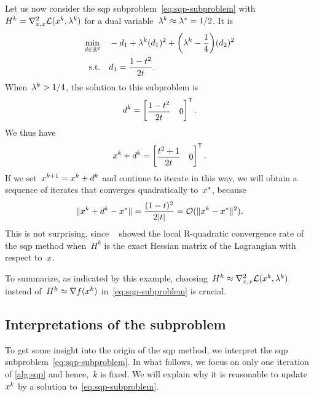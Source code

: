 Let us now consider the \gls{sqp} subproblem~\cref{eq:sqp-subproblem} with~$H^k = \nabla_{x, x}^2 \lag(\iter[k], \lm[k])$ for a dual variable~$\lm[k] \approx \lm[\ast] = 1/2$.
It is
\begin{align*}
    \min_{\step \in \R^2}   & \quad -\step_1 + \lm[k] (\step_1)^2 + \bigg( \lm[k] - \frac{1}{4} \bigg) (\step_2)^2\\
    \text{s.t.}             & \quad \step_1 = \frac{1 - t^2}{2 t}.
\end{align*}
When~$\lm[k] > 1/4$, the solution to this subproblem is
\begin{equation*}
    \step[k] =
    \begin{bmatrix}
        \dfrac{1 - t^2}{2 t}    & 0
    \end{bmatrix}^{\T}.
\end{equation*}
We thus have
\begin{equation*}
    \iter[k] + \step[k] =
    \begin{bmatrix}
        \dfrac{t^2 + 1}{2 t}  & 0
    \end{bmatrix}^{\T}.
\end{equation*}
If we set~$\iter[k + 1] = \iter[k] + \step[k]$ and continue to iterate in this way, we will obtain a sequence of iterates that converges quadratically to~$\iter[\ast]$, because
\begin{equation*}
    \norm{\iter[k] + \step[k] - \iter[\ast]} = \frac{(1 - t)^2}{2 \abs{t}} = \bigo(\norm{\iter[k] - \iter[\ast]}^2).
\end{equation*}
This is not surprising, since \citeauthor{Robinson_1974}~\cite{Robinson_1974} showed the local R-quadratic convergence rate of the \gls{sqp} method when~$H^k$ is the exact Hessian matrix of the Lagrangian with respect to~$\iter$.

To summarize, as indicated by this example, choosing~$H^k \approx \nabla_{x, x}^2 \lag(\iter[k], \lm[k])$ instead of~$H^k \approx \nabla \obj(\iter[k])$ in~\cref{eq:sqp-subproblem} is crucial.

\subsection{Interpretations of the  subproblem}
\label{subsec:sqp-interpretation}

To get some insight into the origin of the \gls{sqp} method, we interpret the \gls{sqp} subproblem~\cref{eq:sqp-subproblem}.
In what follows, we focus on only one iteration of \cref{alg:sqp} and hence,~$k$ is fixed.
We will explain why it is reasonable to update~$\iter[k]$ by a solution to~\cref{eq:sqp-subproblem}.

